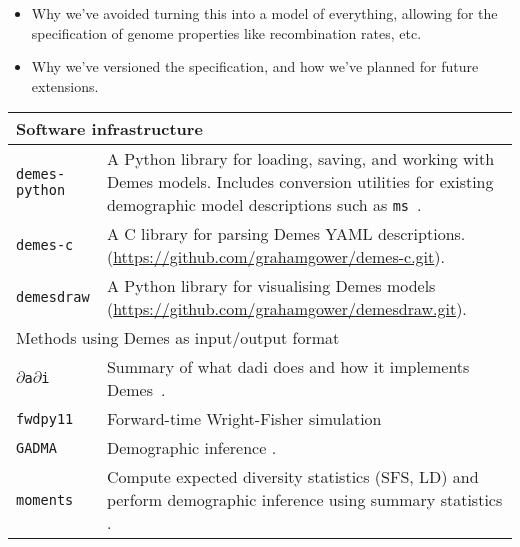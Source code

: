 \documentclass[11pt]{article}
\newcommand{\moments}[0]{\texttt{moments}}
\newcommand{\dadi}[0]{\texttt{$\partial$a$\partial$i}}
\newcommand{\fwdpy}[0]{\texttt{fwdpy11}}
\newcommand{\gadma}[0]{\texttt{GADMA}}
\begin{document}
\begin{itemize}
    \item Why we've avoided turning this into a model of everything, allowing
    for the specification of genome properties like recombination rates,
    etc.

    \item Why we've versioned the specification, and how we've planned
    for future extensions.

\end{itemize}

\renewcommand{\arraystretch}{1.5}
\begin{table}
\begin{center}
\begin{tabular}{lp{12cm}}
\toprule
\multicolumn{2}{l}{Software infrastructure}\\
\midrule
\texttt{demes-python} &
    A Python library for loading, saving, and working with
    Demes models. Includes conversion utilities for existing
    demographic model descriptions such as
    \texttt{ms}~\citep{hudson2002generating}.\\

\texttt{demes-c} &
    A C library for parsing Demes YAML descriptions.
    (\url{https://github.com/grahamgower/demes-c.git}). \\

\texttt{demesdraw} &
    A Python library for visualising Demes models
    (\url{https://github.com/grahamgower/demesdraw.git}). \\

\midrule
\multicolumn{2}{l}{Methods using Demes as input/output format}\\
\midrule


\dadi &
    Summary of what dadi does and how it implements Demes~\citep{gutenkunst2009inferring}.
    \\

\fwdpy &
    Forward-time Wright-Fisher simulation \citep{thornton2014cpp}\\

\gadma &
    Demographic inference \citep{noskova2020gadma}.\\

\moments &
    Compute expected diversity statistics (SFS, LD) and perform
    demographic inference using summary statistics
    \citep{jouganous2017inferring,ragsdale2019models}.\\


\end{tabular}
\end{center}
\end{table}
\end{document}
